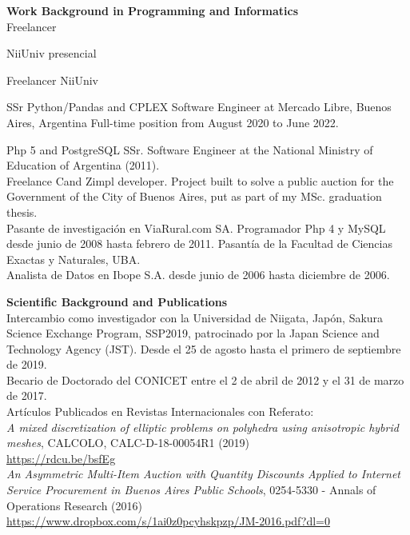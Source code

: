 \textbf{Work Background in Programming and Informatics}\\[6pt]
Freelancer

NiiUniv presencial

Freelancer NiiUniv

SSr Python/Pandas and CPLEX Software Engineer at Mercado Libre, Buenos Aires, Argentina 
Full-time position from August 2020 to June 2022. 

Php 5 and PostgreSQL SSr. Software Engineer at the
National Ministry of Education of Argentina (2011).\\[4pt]

Freelance C\masmas and Zimpl developer. Project built to solve a public
auction for the Government of the City of Buenos Aires, put as part of my
MSc. graduation thesis.\\[4pt]

Pasante de investigaci\'on en ViaRural.com SA. Programador
Php 4 y MySQL desde junio de 2008 
hasta febrero de 2011. Pasant\'ia de la Facultad de Ciencias Exactas y Naturales, UBA.\\[4pt]
Analista de Datos en Ibope S.A. desde junio de 2006 hasta diciembre de 2006.

\textbf{Scientific Background and Publications}\\[6pt]
Intercambio como investigador con la Universidad de Niigata, Jap\'on,
Sakura Science Exchange Program, SSP2019, patrocinado por
la Japan Science and Technology Agency (JST). Desde el 25 de agosto
hasta el primero de septiembre de 2019.\\[6pt]
Becario de Doctorado del CONICET entre el 2 de abril de 2012 y el 31 de marzo de 2017.\\[6pt]
Art\'iculos Publicados en Revistas Internacionales con Referato:\\[6pt]
\emph{A mixed discretization of elliptic problems on polyhedra using anisotropic hybrid meshes},
CALCOLO, CALC-D-18-00054R1 (2019)\\
\href{http://em.rdcu.be/wf/click?upn=lMZy1lernSJ7apc5DgYM8RtiRnX98cgbvE81KQGn5tE-3D_-2Fq09Vpjrycd-2BAOhvYDidHaHWLaG8WMoWs1lRs2mKTzqCwYNFhlGtplH8kb8yUCOrEFESCWAEP1qrD-2BJgg09nu-2Fz61XDXWYdppeXx4JzFRLvI-2FYyjZMrov-2FaxFxLv9MaqfC-2BjYanB-2FkLIArphbTB7hvuq-2BJ-2BP0dpoVrgh2NJYizQcMbyo6AA8jcx6RYsWvb3RMk9c7QXTqmoLaHKr8Xg6yK2lC1IxrYwuPPxXUxfxXQc0WAqTO-2Bg-2F9P-2BWkhJXyogoqkg5GNjl1KqQhJV5xi014g-3D-3D}{\color{blue}https://rdcu.be/bsfEg}
\\[4pt]
\emph{An Asymmetric Multi-Item Auction with Quantity Discounts Applied to Internet 
Service Procurement in Buenos Aires Public Schools}, 
0254-5330 - Annals of Operations Research (2016)\\
\href{https://www.dropbox.com/s/1ai0z0pcyhskpzp/JM-2016.pdf?dl=0}{\color{blue}https://www.dropbox.com/s/1ai0z0pcyhskpzp/JM-2016.pdf?dl=0}\\[6pt]

